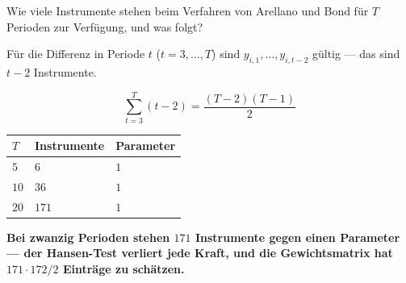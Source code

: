 \begin{aufgabe}
Wie viele Instrumente stehen beim Verfahren von Arellano und Bond für $T$ Perioden zur Verfügung, und was folgt?

\loesung
{}
Für die Differenz in Periode $t$ ($t = 3,\ldots,T$) sind $y_{i,1},\ldots,y_{i,t-2}$ gültig --- das sind $t-2$ Instrumente.

\[ \sum_{t=3}^{T}(t-2) = \frac{(T-2)(T-1)}{2} \]
\begin{center}
{\small
\renewcommand{\arraystretch}{1.48}
\begin{tabular}{@{}P{1.4cm}P{2.4cm}P{2.6cm}@{}}
\toprule
$T$ & \textbf{Instrumente} & \textbf{Parameter}\\
\midrule
$5$ & $6$ & $1$\\
$10$ & $36$ & $1$\\
$20$ & $171$ & $1$\\
\bottomrule
\end{tabular}}
\end{center}

\begin{center}
\begin{minipage}{0.9\textwidth}
\textbf{Bei zwanzig Perioden stehen $171$ Instrumente gegen einen Parameter --- der Hansen-Test verliert jede Kraft, und die Gewichtsmatrix hat $171\cdot172/2$ Einträge zu schätzen.}
\end{minipage}
\end{center}

\begin{center}
\begin{minipage}{0.88\textwidth}
\end{minipage}
\end{center}
\end{aufgabe}

